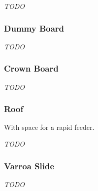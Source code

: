 \emph{TODO}

\subsubsection{Dummy Board}

\emph{TODO}

\subsubsection{Crown Board}

\emph{TODO}

\subsubsection{Roof}

With space for a rapid feeder.

\emph{TODO}

\subsubsection{Varroa Slide}

\emph{TODO}


